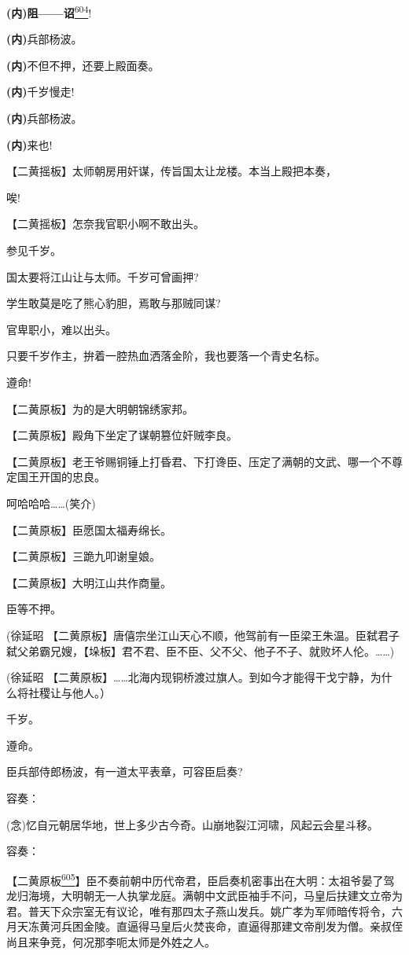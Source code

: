 \textbf{(内)阻------诏}\protect\hyperlink{fn604}{\textsuperscript{604}}!

\textbf{(内)}兵部杨波。

\textbf{(内)}不但不押，还要上殿面奏。

\textbf{(内)}千岁慢走!

\textbf{(内)}兵部杨波。

\textbf{(内)}来也!

【二黄摇板】太师朝房用奸谋，传旨国太让龙楼。本当上殿把本奏，

唉!

【二黄摇板】怎奈我官职小啊不敢出头。

参见千岁。

国太要将江山让与太师。千岁可曾画押?

学生敢莫是吃了熊心豹胆，焉敢与那贼同谋?

官卑职小，难以出头。

只要千岁作主，拚着一腔热血洒落金阶，我也要落一个青史名标。

遵命!

【二黄原板】为的是大明朝锦绣家邦。

【二黄原板】殿角下坐定了谋朝篡位奸贼李良。

【二黄原板】老王爷赐铜锤上打昏君、下打谗臣、压定了满朝的文武、哪一个不尊定国王开国的忠良。

呵哈哈哈\ldots{}\ldots{}(笑介)

【二黄原板】臣愿国太福寿绵长。

【二黄原板】三跪九叩谢皇娘。

【二黄原板】大明江山共作商量。

臣等不押。

(徐延昭
【二黄原板】唐僖宗坐江山天心不顺，他驾前有一臣梁王朱温。臣弑君子弑父弟霸兄嫂，【垛板】君不君、臣不臣、父不父、他子不子、就败坏人伦。\ldots{}\ldots{})

(徐延昭
【二黄原板】\ldots{}\ldots{}北海内现铜桥渡过旗人。到如今才能得干戈宁静，为什么将社稷让与他人。）

千岁。

遵命。

臣兵部侍郎杨波，有一道太平表章，可容臣启奏?

容奏：

(念)忆自元朝居华地，世上多少古今奇。山崩地裂江河啸，风起云会星斗移。

容奏：

【二黄原板\protect\hyperlink{fn605}{\textsuperscript{605}}】臣不奏前朝中历代帝君，臣启奏机密事出在大明：太祖爷晏了驾龙归海境，大明朝无一人执掌龙庭。满朝中文武臣袖手不问，马皇后扶建文立帝为君。普天下众宗室无有议论，唯有那四太子燕山发兵。姚广孝为军师暗传将令，六月天冻黄河兵困金陵。直逼得马皇后火焚丧命，直逼得那建文帝削发为僧。亲叔侄尚且来争竞，何况那李呃太师是外姓之人。

